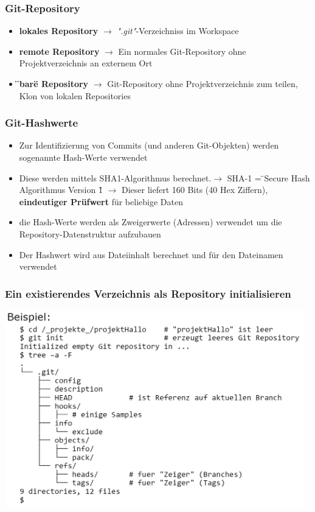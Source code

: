 \subsubsection{Git-Repository}
\begin{itemize}
	\item \textbf{lokales Repository} $\rightarrow$ \textit{".git"}-Verzeichniss im Workspace
	\item \textbf{remote Repository} $\rightarrow$ Ein normales Git-Repository ohne Projektverzeichnis an externem Ort
	\item \textbf{\"{}bare\"{} Repository} $\rightarrow$ Git-Repository ohne Projektverzeichnis zum teilen, Klon von lokalen Repositories
\end{itemize}
\subsubsection{Git-Hashwerte}
\begin{itemize}
	\item Zur Identifizierung von Commits (und anderen Git-Objekten) werden sogenannte Hash-Werte verwendet
	\item Diese werden mittels SHA1-Algorithmus berechnet.\newline $\rightarrow$ SHA-1 = \"{}Secure Hash Algorithmus Version 1\"{}\newline
	$\rightarrow$ Dieser liefert 160 Bits (40 Hex Ziffern), \textbf{eindeutiger Prüfwert} für beliebige Daten
	\item die Hash-Werte werden als Zweigerwerte (Adressen) verwendet um die Repository-Datenstruktur aufzubauen
	\item Der Hashwert wird aus Dateiinhalt berechnet und für den Dateinamen verwendet
\end{itemize}
\subsubsection{Ein existierendes Verzeichnis als Repository initialisieren}
\includegraphics[width = 13cm]{images/bsprepo}
